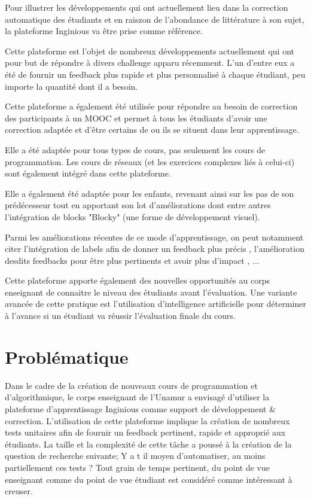 \documentclass[a4paper]{report}
\begin{document}
Pour illustrer les développements qui ont actuellement lieu dans la correction automatique des étudiants et en raiszon de l'abondance de littérature à son sujet, la plateforme Inginious va être prise comme référence.

Cette plateforme est l'objet de nombreux développements actuellement qui ont pour but de répondre à divers challenge apparu récemment.
L'un d'entre eux a été de fournir un feedback plus rapide et plus personnalisé à chaque étudiant, peu importe la quantité dont il a besoin\cite{Staubitz2017}.

Cette plateforme a également été utilisée pour répondre au besoin de correction des participants à un MOOC et permet à tous les étudiants d'avoir une correction adaptée et d'être certains de ou ils se situent dans leur apprentissage\cite{derval2015automatic}.

Elle a été adaptée pour tous types de cours, pas seulement les cours de programmation.
Les cours de réseaux (et les exercices complexes liés à celui-ci) sont également intégré dans cette plateforme\cite{Bonaventure2020}.

Elle a également été adaptée pour les enfants, revenant ainsi sur les pas de son prédécesseur tout en apportant son lot d'améliorations\cite{Thuin} dont entre autres l'intégration de blocks "Blocky" (une forme de développement visuel).

Parmi les améliorations récentes de ce mode d'apprentissage, on peut notamment citer l'intégration de labels afin de donner un feedback plus précis \cite{Martin}, l'amélioration desdits feedbacks pour être plus pertinents et avoir plus d'impact \cite{Derval2022}, ...

Cette plateforme apporte également des nouvelles opportunités au corps enseignant de connaitre le niveau des étudiants avant l'évaluation.
Une variante avancée de cette pratique est l'utilisation d'intelligence artificielle pour déterminer à l'avance si un étudiant va réussir l'évaluation finale du cours\cite{Hormaux}.


\chapter{Problématique}

Dans le cadre de la création de nouveaux cours de programmation et d'algorithmique, le corps enseignant de l’Unamur a envisagé d'utiliser la plateforme d'apprentissage Inginious comme support de développement \& correction.
L'utilisation de cette plateforme implique la création de nombreux tests unitaires afin de fournir un feedback pertinent, rapide et approprié aux étudiants.
La taille et la complexité de cette tâche a poussé à la création de la question de recherche suivante; Y a t il moyen d'automatiser, au moins partiellement ces tests ?
Tout grain de temps pertinent, du point de vue enseignant comme du point de vue étudiant est considéré comme intéressant à creuser.
\end{document}
